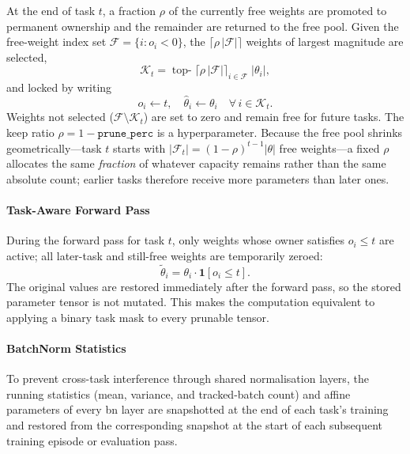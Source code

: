 At the end of task $t$, a fraction $\rho$ of the currently free weights
are promoted to permanent ownership and the remainder are returned to the free
pool. Given the free-weight index set $\mathcal{F} = \{i : o_i < 0\}$, the
$\lceil\rho\,|\mathcal{F}|\rceil$ weights of largest magnitude are selected,
%
\begin{equation}\label{eqn:packnet_topk}
    \mathcal{K}_t
    =
    \operatorname{top-}\!\lceil\rho\,|\mathcal{F}|\rceil_{i\in\mathcal{F}}
    \;|\theta_i| ,
\end{equation}
%
and locked by writing
%
\begin{equation}\label{eqn:packnet_lock}
    o_i \leftarrow t,
    \quad
    \hat\theta_i \leftarrow \theta_i
    \quad \forall\, i \in \mathcal{K}_t .
\end{equation}
%
Weights not selected ($\mathcal{F}\setminus\mathcal{K}_t$) are set to zero and
remain free for future tasks. The keep ratio $\rho = 1 - \texttt{prune\_perc}$ is
a hyperparameter. Because the free pool shrinks geometrically---task $t$ starts
with $|\mathcal{F}_t| = (1-\rho)^{t-1}|\theta|$ free weights---a fixed $\rho$
allocates the same \emph{fraction} of whatever capacity remains rather than the
same absolute count; earlier tasks therefore receive more parameters than later
ones.

\paragraph{Task-Aware Forward Pass}

During the forward pass for task $t$, only weights whose owner satisfies
$o_i \leq t$ are active; all later-task and still-free weights are temporarily
zeroed:
%
\begin{equation}\label{eqn:packnet_fwd}
    \tilde\theta_i = \theta_i \cdot \mathbf{1}[o_i \leq t] .
\end{equation}
%
The original values are restored immediately after the forward pass, so the stored
parameter tensor is not mutated. This makes the computation equivalent to applying
a binary task mask to every prunable tensor.

\paragraph{BatchNorm Statistics}

To prevent cross-task interference through shared normalisation layers, the
running statistics (mean, variance, and tracked-batch count) and affine parameters
of every \gls{bn} layer are snapshotted at the end of each task's training and
restored from the corresponding snapshot at the start of each subsequent training
episode or evaluation pass.

